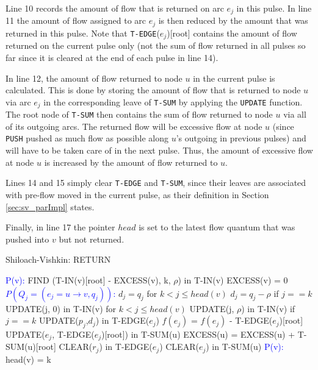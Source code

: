\documentclass[a4paper,10pt, twocolumn]{article}
\begin{document}
Line 10 records the amount of flow that is returned on arc $e_j$ in this pulse. In line 11 the amount of flow assigned to arc $e_j$ is then reduced by the amount that was returned in this pulse. Note that \lstinline|T-EDGE|($e_j$)[root] contains the amount of flow returned on the current pulse only (not the sum of flow returned in all pulses so far since it is cleared at the end of each pulse in line 14).

In line 12, the amount of flow returned to node $u$ in the current pulse is calculated. This is done by storing the amount of flow that is returned to node $u$ via arc $e_j$ in the corresponding leave of \lstinline|T-SUM| by applying the \lstinline|UPDATE| function. The root node of \lstinline|T-SUM| then contains the sum of flow returned to node $u$ via all of its outgoing arcs. The returned flow will be excessive flow at node $u$ (since \lstinline|PUSH| pushed as much flow as possible along $u$'s outgoing in previous pulses) and will have to be taken care of in the next pulse. Thus, the amount of excessive flow at node $u$ is increased by the amount of flow returned to $u$.

Lines 14 and 15 simply clear \lstinline|T-EDGE| and \lstinline|T-SUM|, since their leaves are associated with pre-flow moved in the current pulse, as their definition in Section \ref{sec:sv_parImpl} states.

Finally, in line 17 the pointer $head$ is set to the latest flow quantum that was pushed into $v$ but not returned.

\begin{algorithm}
\caption{Shiloach-Vishkin: RETURN}
\label{algo:sv_return}
\begin{algorithmic}[1]
		\State \textcolor{blue}{P(v):}
		\State FIND (T-IN(v)[root] - EXCESS(v), k, $\rho$) in T-IN(v)
		\State EXCESS(v) = 0
		\State \textcolor{blue}{$P(Q_j = (e_j = u \rightarrow v, q_j))$:}
		\State $d_j = q_j$ for $k < j \leq head(v)$
		\State $d_j = q_j - \rho$ if $j == k$
		\State UPDATE(j, 0) in T-IN(v) for $k < j \leq head(v)$
		\State UPDATE(j, $\rho$) in T-IN(v) if $j == k$
		\State UPDATE($p_j$,$d_j$) in T-EDGE($e_j$)
		\State $f(e_j)$ = $f(e_j)$ - T-EDGE($e_j$)[root]
		\State UPDATE($e_j$, T-EDGE($e_j$)[root]) in T-SUM(u)
		\State EXCESS(u) = EXCESS(u) + T-SUM(u)[root]
		\State CLEAR($r_j$) in T-EDGE($e_j$)
		\State CLEAR($e_j$) in T-SUM(u)
		\State \textcolor{blue}{P(v):}
		\State head(v) = k
	\EndFunction
\end{algorithmic}
\end{algorithm}
\end{document}
